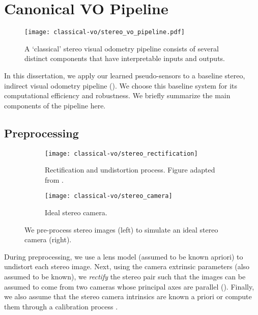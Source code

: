 \section{Canonical VO Pipeline}

\begin{figure}[h!]
\begin{center}
		\texttt{[image: classical-vo/stereo\_vo\_pipeline.pdf]}
		\caption{A `classical' stereo visual odometry pipeline consists of several distinct components that have interpretable inputs and outputs.}
  	\label{fig:vo_stereo_vo_pipeline}
\end{center}
\end{figure}

In this dissertation, we apply our learned pseudo-sensors to a baseline stereo, indirect visual odometry pipeline (). We choose this baseline system for its computational efficiency and robustness. We briefly summarize the main components of the pipeline here.



\subsection{Preprocessing}


\begin{figure}[h!]
     \centering
     \begin{subfigure}[b]{0.48\textwidth}
         \centering
         \texttt{[image: classical-vo/stereo\_rectification]}
        \caption{Rectification and undistortion process. Figure adapted from \cite{florez2010}.}
         \label{fig:vo_undistort_recitfy}
	 \end{subfigure}
	 \begin{subfigure}[b]{0.48\textwidth}
         \centering
     		\texttt{[image: classical-vo/stereo\_camera]}
			\caption{Ideal stereo camera.}
			 \label{fig:vo_stereo_camera}
     \end{subfigure}
    \caption{We pre-process stereo images (left) to simulate an ideal stereo camera (right).}
        \label{fig:vo_preprocessing}
\end{figure}
During preprocessing, we use a lens model (assumed to be known apriori) to undistort each stereo image. Next, using the camera extrinsic parameters (also assumed to be known), we \textit{rectify} the stereo pair such that the images can be assumed to come from two cameras whose principal axes are parallel (). Finally, we also assume that the stereo camera intrinsics are known a priori or compute them through a calibration process \citep{Furgale2013-sl}.

